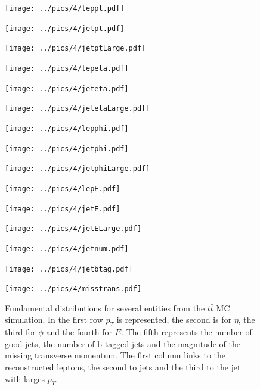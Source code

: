 \begin{figure}[h]
\begin{minipage}{0.32\textwidth}
 \texttt{[image: ../pics/4/leppt.pdf]}
\end{minipage}
\begin{minipage}{0.32\textwidth}
 \texttt{[image: ../pics/4/jetpt.pdf]}
\end{minipage}
\begin{minipage}{0.32\textwidth}
 \texttt{[image: ../pics/4/jetptLarge.pdf]}
\end{minipage}
\begin{minipage}{0.32\textwidth}
 \texttt{[image: ../pics/4/lepeta.pdf]}
\end{minipage}
\begin{minipage}{0.32\textwidth}
 \texttt{[image: ../pics/4/jeteta.pdf]}
\end{minipage}
\begin{minipage}{0.32\textwidth}
 \texttt{[image: ../pics/4/jetetaLarge.pdf]}
\end{minipage}
\begin{minipage}{0.32\textwidth}
 \texttt{[image: ../pics/4/lepphi.pdf]}
\end{minipage}
\begin{minipage}{0.32\textwidth}
 \texttt{[image: ../pics/4/jetphi.pdf]}
\end{minipage}
\begin{minipage}{0.32\textwidth}
 \texttt{[image: ../pics/4/jetphiLarge.pdf]}
\end{minipage}
\begin{minipage}{0.32\textwidth}
 \texttt{[image: ../pics/4/lepE.pdf]}
\end{minipage}
\begin{minipage}{0.32\textwidth}
 \texttt{[image: ../pics/4/jetE.pdf]}
\end{minipage}
\begin{minipage}{0.32\textwidth}
 \texttt{[image: ../pics/4/jetELarge.pdf]}
\end{minipage}
\begin{minipage}{0.32\textwidth}
 \texttt{[image: ../pics/4/jetnum.pdf]}
\end{minipage}
\begin{minipage}{0.32\textwidth}
 \texttt{[image: ../pics/4/jetbtag.pdf]}
\end{minipage}
\begin{minipage}{0.32\textwidth}
 \texttt{[image: ../pics/4/misstrans.pdf]}
\end{minipage}
\caption{\small{Fundamental distributions for several entities from the $t\bar t$ MC simulation. In the first row $p_T$ is represented, the second is for $\eta$, the third for $\phi$ and
the fourth for $E$. The fifth represents the number of good jets, the number of b-tagged jets and the magnitude of the missing transverse momentum.
The first column links to the reconstructed leptons, the second to jets and the third to the jet with larges $p_T$.}}
\label{pic:fundamental}
\end{figure}\\ \noindent
